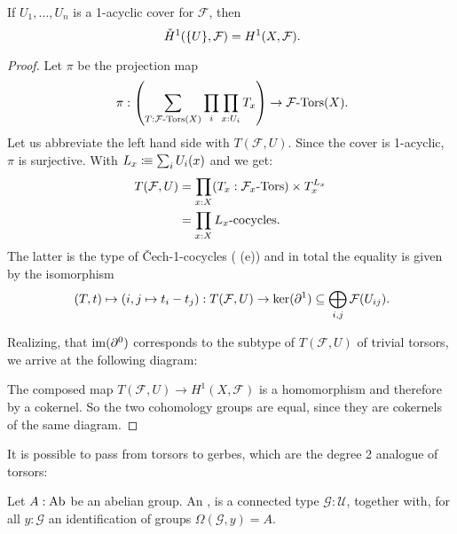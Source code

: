 \begin{theorem}%
  If $U_1,\dots,U_n$ is a 1-acyclic cover for $\mathcal F$, then
  \[
    \check{H}^1(\{U\},\mathcal F)=H^1(X,\mathcal F)\rlap{.}
  \]
\end{theorem}

\begin{proof}
  Let $\pi$ be the projection map
  \[
    \pi :
    \left(
      \sum_{T:\Tors{\mathcal F}(X)}\prod_{i}\prod_{x:U_i}T_x
    \right)
    \to \Tors{\mathcal F}(X)\rlap{.}
  \]
  Let us abbreviate the left hand side with $T(\mathcal F,U)$.
  Since the cover is 1-acyclic, $\pi$ is surjective.
  With $L_x\vcentcolon\mspace{-1.2mu}\equiv \sum_{i}U_i(x)$ and  we get:
  \begin{align*}
    T(\mathcal F,U)&=\prod_{x:X}(T_x:\Tors{\mathcal F_x})\times T_x^{L_x} \\
                   &=\prod_{x:X}\text{$L_x$-cocycles}
                     \rlap{.}
  \end{align*}
  The latter is the type of \v{C}ech-1-cocycles ( (e))
  and in total the equality is given by the isomorphism
  \[
    (T,t) \mapsto (i,j\mapsto t_i - t_j) :
    T(\mathcal F,U)
    \to
    \ker(\partial^1)
    \subseteq
    \bigoplus_{i,j}\mathcal F(U_{ij})\rlap{.}
  \]

  Realizing, that $\operatorname{im}(\partial^0)$ corresponds to the subtype of $T(\mathcal F,U)$ of trivial torsors,
  we arrive at the following diagram:
  \begin{center}
  \end{center}
  The composed map $T(\mathcal F,U)\to H^1(X,\mathcal F)$ is a homomorphism
  and therefore by  a cokernel.
  So the two cohomology groups are equal, since they are cokernels of the same diagram.
\end{proof}

It is possible to pass from torsors to gerbes,
which are the degree 2 analogue of torsors:

\begin{definition}
  \label{gerbe}
  Let $A:\operatorname{Ab}$ be an abelian group.
  An , is a connected type $\mathcal G:\mathcal U$,
  together with, for all $y:\mathcal G$ an identification of groups $\Omega (\mathcal G,y)=A$.
\end{definition}

